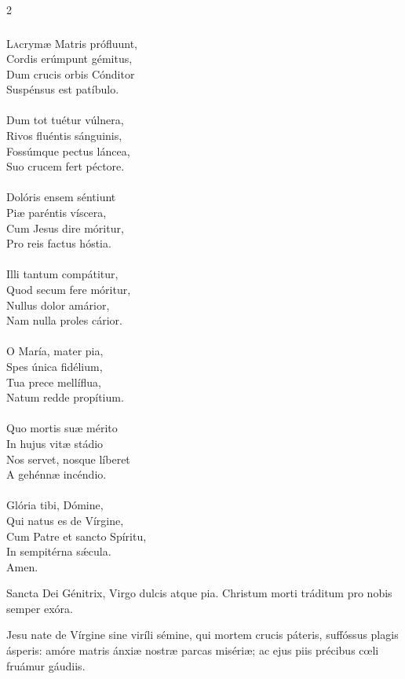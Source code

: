 \documentclass[9pt,twoside]{extarticle}
\begin{document}
\begin{multicols}{2}
\subsubsection*{\center {}}
\lettrine{L}acrymæ Matris prófluunt,\\
Cordis erúmpunt gémitus,\\
Dum crucis orbis Cónditor\\
Suspénsus est patíbulo.\\
\\
Dum tot tuétur vúlnera,\\
Rivos fluéntis sánguinis,\\
Fossúmque pectus láncea,\\
Suo crucem fert péctore.\\
\\
Dolóris ensem séntiunt\\
Piæ paréntis víscera,\\
Cum Jesus dire móritur,\\
Pro reis factus hóstia.\\
\\
Illi tantum compátitur,\\
Quod secum fere móritur,\\
Nullus dolor amárior,\\
Nam nulla proles cárior.\\
\\
O María, mater pia,\\
Spes única fidélium,\\
Tua prece mellíflua,\\
Natum redde propítium.\\
\\
Quo mortis suæ mérito\\
In hujus vitæ stádio\\
Nos servet, nosque líberet\\
A gehénnæ incéndio.\\
\\
Glória tibi, Dómine,\\
Qui natus es de Vírgine,\\
Cum Patre et sancto Spíritu,\\
In sempitérna sǽcula.\\
Amen.

\begin{tightlist}{}
\item {}
\item {} Sancta Dei Génitrix, Virgo dulcis atque pia.  Christum morti tráditum pro nobis semper exóra.
\item {} Jesu nate de Vírgine sine viríli sémine, qui mortem crucis páteris, suffóssus plagis ásperis: amóre matris ánxiæ nostræ parcas misériæ; ac ejus piis précibus cœli fruámur gáudiis.
\end{tightlist}


\end{multicols}
\end{document}
